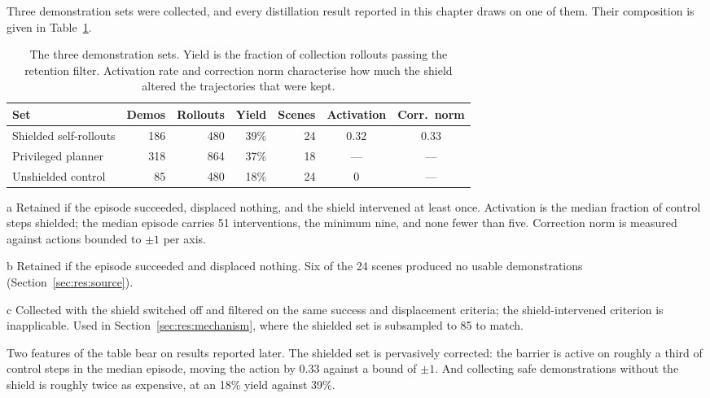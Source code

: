 Three demonstration sets were collected, and every distillation result reported in this chapter
draws on one of them. Their composition is given in Table~\ref{tab:demo_sets}.

\begin{table}[htbp]
\centering
\begin{threeparttable}
\caption[Composition of the demonstration sets]{%
  The three demonstration sets. Yield is the fraction of collection rollouts passing the retention
  filter. Activation rate and correction norm characterise how much the shield altered the
  trajectories that were kept.}
\label{tab:demo_sets}
\begin{tabular}{lrrrrcc}
\toprule
\textbf{Set} & \textbf{Demos} & \textbf{Rollouts} & \textbf{Yield} & \textbf{Scenes}
  & \textbf{Activation} & \textbf{Corr.\ norm} \\
\midrule
Shielded self-rollouts\tnote{a}  & 186 & 480 & 39\% & 24 & 0.32 & 0.33 \\
Privileged planner\tnote{b}      & 318 & 864 & 37\% & 18 & ---  & ---  \\
Unshielded control\tnote{c}      & \phantom{0}85 & 480 & 18\% & 24 & 0    & ---  \\
\bottomrule
\end{tabular}
\begin{tablenotes}[flushleft]\footnotesize
\item[a] Retained if the episode succeeded, displaced nothing, and the shield intervened at least
  once. Activation is the median fraction of control steps shielded; the median episode carries 51
  interventions, the minimum nine, and none fewer than five. Correction norm is measured against
  actions bounded to $\pm 1$ per axis.
\item[b] Retained if the episode succeeded and displaced nothing. Six of the 24 scenes produced no
  usable demonstrations (Section~\ref{sec:res:source}).
\item[c] Collected with the shield switched off and filtered on the same success and displacement
  criteria; the shield-intervened criterion is inapplicable. Used in
  Section~\ref{sec:res:mechanism}, where the shielded set is subsampled to 85 to match.
\end{tablenotes}
\end{threeparttable}
\end{table}

Two features of the table bear on results reported later. The shielded set is pervasively
corrected: the barrier is active on roughly a third of control steps in the median episode, moving
the action by 0.33 against a bound of $\pm 1$. And collecting safe demonstrations without the
shield is roughly twice as expensive, at an 18\% yield against 39\%.



